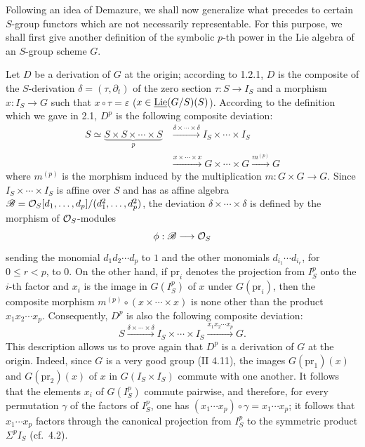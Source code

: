 Following an idea of Demazure, we shall now generalize what precedes to certain $S$-group functors which are not necessarily representable. For this purpose, we shall first give another definition of the symbolic $p$-th power in the Lie algebra of an $S$-group scheme $G$.

Let $D$ be a derivation of $G$ at the origin; according to 1.2.1, $D$ is the composite of the $S$-derivation $\delta=(\tau,\partial_t)$ of the zero section $\tau:S\to I_S$ and a morphism $x:I_S\to G$ such that $x\circ\tau=\varepsilon$ (\ie $x\in\underline{\operatorname{Lie}}(G/S)(S)$). According to the definition which we gave in 2.1, $D^p$ is the following composite deviation:
\[
\begin{aligned}
S\simeq\underbrace{S\times S\times\cdots\times S}_p
&\xrightarrow{\delta\times\cdots\times\delta}I_S\times\cdots\times I_S\\
&\xrightarrow{x\times\cdots\times x}G\times\cdots\times G\xrightarrow{m^{(p)}}G
\end{aligned}
\]
where $m^{(p)}$ is the morphism induced by the multiplication $m:G\times G\to G$. Since $I_S\times\cdots\times I_S$ is affine over $S$ and has as affine algebra $\mathscr B=\mathcal{O}_S[d_1,\ldots,d_p]/(d_1^2,\ldots,d_p^2)$, the deviation $\delta\times\cdots\times\delta$ is defined by the morphism of $\mathcal{O}_S$-modules
\[
\phi:\mathscr B\longrightarrow\mathcal{O}_S
\]
sending the monomial $d_1d_2\cdots d_p$ to $1$ and the other monomials $d_{i_1}\cdots d_{i_r}$, for $0\leq r<p$, to $0$. On the other hand, if $\mathrm{pr}_i$ denotes the projection from $I_S^p$ onto the $i$-th factor and $x_i$ is the image in $G(I_S^p)$ of $x$ under $G(\mathrm{pr}_i)$, then the composite morphism $m^{(p)}\circ(x\times\cdots\times x)$ is none other than the product $x_1x_2\cdots x_p$. Consequently, $D^p$ is also the following composite deviation:
\[
S\xrightarrow{\delta\times\cdots\times\delta}I_S\times\cdots\times I_S\xrightarrow{x_1x_2\cdots x_p}G.
\]
This description allows us to prove again that $D^p$ is a derivation of $G$ at the origin. Indeed, since $G$ is a very good group (II 4.11), the images $G(\mathrm{pr}_1)(x)$ and $G(\mathrm{pr}_2)(x)$ of $x$ in $G(I_S\times I_S)$ commute with one another. It follows that the elements $x_i$ of $G(I_S^p)$ commute pairwise, and therefore, for every permutation $\gamma$ of the factors of $I_S^p$, one has $(x_1\cdots x_p)\circ\gamma=x_1\cdots x_p$; it follows that $x_1\cdots x_p$ factors through the canonical projection from $I_S^p$ to the symmetric product $\Sigma^p I_S$ (cf.\ 4.2).

